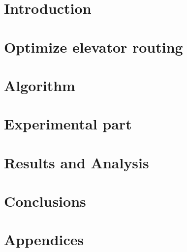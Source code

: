 \documentclass{scrartcl}
\title{\reportname}
\subtitle{An Evolutionary aproch for elevator time optimization.}
\author{Oskar Sundberg \and Linus Savinainen \and Samuel Wallander Leyonberg \and Gustav Pråmell \and Joel Scarinius Stävmo}
\date{\today}
\begin{document}
\maketitle

\newpage

\tableofcontents

\newpage

\section{Introduction}
\label{sec:intro}


\newpage

\section{Optimize elevator routing}
\label{sec:problem_description}


\newpage

\section{Algorithm}
\label{sec:algorithm}


\newpage

\section{Experimental part}
\label{sec:experimentation}


\newpage

\section{Results and Analysis}
\label{sec:results-analysis}


\newpage

\section{Conclusions}
\label{sec:conclusions}


\newpage

\appendix
\section{Appendices}
\label{sec:appendices}


\newpage



\end{document}

